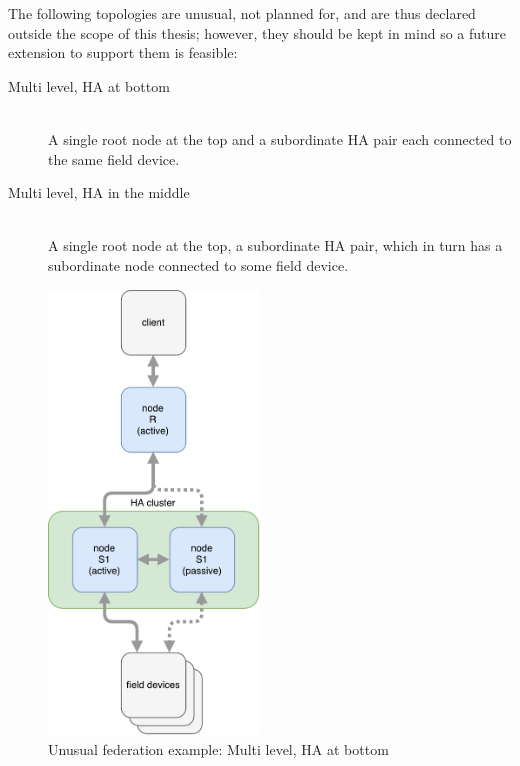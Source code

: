 The following topologies are unusual, not planned for, and are thus declared
outside the scope of this thesis; however, they should be kept in mind so a
future extension to support them is feasible:

\begin{description}
	\item [ Multi level, \gls{HA} at bottom ] \hfill\\
	A single root node at the top and a subordinate HA pair each connected
	to the same field device.

	\item [ Multi level, \gls{HA} in the middle ] \hfill\\
	A single root node at the top, a subordinate HA pair, which in turn has
	a subordinate node connected to some field device.
\end{description}

\begin{figure}[]
	\center
	\includegraphics[width=0.5\textwidth]{img/ml_ha_on_sub_exotic_topology.pdf}
	\caption{Unusual federation example: Multi level, \gls{HA} at bottom}
	\label{fig:topo:exotic:ml:ha:on:sub}
\end{figure}

